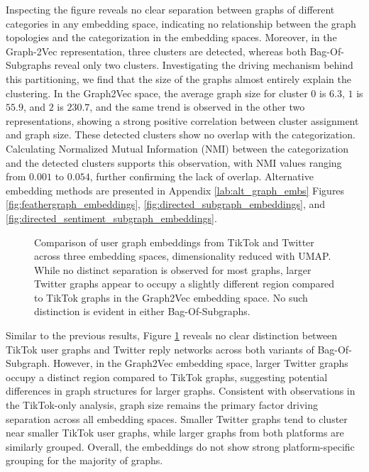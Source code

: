 Inspecting the figure reveals no clear separation between graphs of different categories in any embedding space, indicating no relationship between the graph topologies and the categorization in the embedding spaces. Moreover, in the Graph-2Vec representation, three clusters are detected, whereas both Bag-Of-Subgraphs reveal only two clusters. Investigating the driving mechanism behind this partitioning, we find that the size of the graphs almost entirely explain the clustering. In the Graph2Vec space, the average graph size for cluster $0$ is $6.3$, $1$ is $55.9$, and $2$ is $230.7$, and the same trend is observed in the other two representations, showing a strong positive correlation between cluster assignment and graph size. These detected clusters show no overlap with the categorization. Calculating Normalized Mutual Information (NMI) between the categorization and the detected clusters supports this observation, with NMI values ranging from $0.001$ to $0.054$, further confirming the lack of overlap. Alternative embedding methods are presented in Appendix \ref{lab:alt_graph_embs} Figures \ref{fig:feathergraph_embeddings}, \ref{fig:directed_subgraph_embeddings}, and \ref{fig:directed_sentiment_subgraph_embeddings}.


\begin{figure}[!htbp]
    \centering
    \begin{adjustwidth}{-\textwidth}{-\textwidth}
        \centering
        
    \end{adjustwidth}
    \caption{Comparison of user graph embeddings from TikTok and Twitter across three embedding spaces, dimensionality reduced with UMAP. While no distinct separation is observed for most graphs, larger Twitter graphs appear to occupy a slightly different region compared to TikTok graphs in the Graph2Vec embedding space. No such distinction is evident in either Bag-Of-Subgraphs.}
    \label{fig:twitter_scatter}
\end{figure}

Similar to the previous results, Figure \ref{fig:twitter_scatter} reveals no clear distinction between TikTok user graphs and Twitter reply networks across both variants of Bag-Of-Subgraph. However, in the Graph2Vec embedding space, larger Twitter graphs occupy a distinct region compared to TikTok graphs, suggesting potential differences in graph structures for larger graphs. Consistent with observations in the TikTok-only analysis, graph size remains the primary factor driving separation across all embedding spaces. Smaller Twitter graphs tend to cluster near smaller TikTok user graphs, while larger graphs from both platforms are similarly grouped. Overall, the embeddings do not show strong platform-specific grouping for the majority of graphs.

